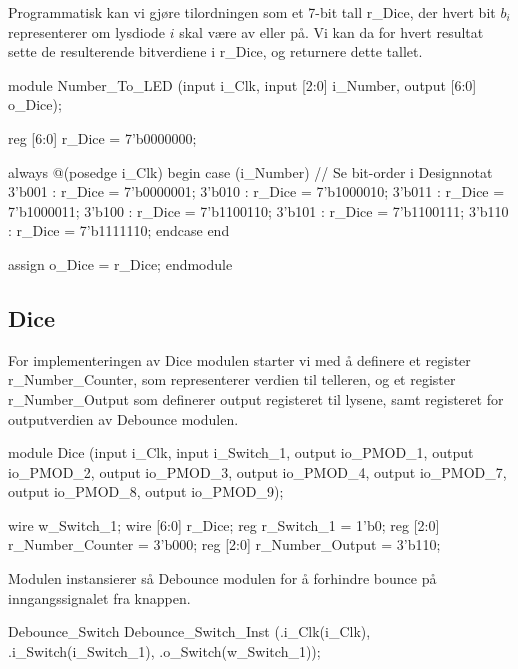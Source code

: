 Programmatisk kan vi gjøre tilordningen som et 7-bit tall r\_Dice, der hvert bit 
$b_i$ representerer om lysdiode $i$ skal være av eller på. Vi kan da for hvert resultat 
sette de resulterende bitverdiene i r\_Dice, og returnere dette tallet. 
\begin{verilogcode}
    module Number_To_LED
        (input i_Clk,
        input [2:0] i_Number,
        output [6:0] o_Dice);

     reg [6:0] r_Dice = 7'b0000000;

     always @(posedge i_Clk)
     begin
         case (i_Number) // Se bit-order i Designnotat 
             3'b001 : r_Dice = 7'b0000001;
             3'b010 : r_Dice = 7'b1000010;
             3'b011 : r_Dice = 7'b1000011;
             3'b100 : r_Dice = 7'b1100110;
             3'b101 : r_Dice = 7'b1100111;
             3'b110 : r_Dice = 7'b1111110;
         endcase
     end

     assign o_Dice = r_Dice;
    endmodule
\end{verilogcode}

\subsection{Dice}
For implementeringen av Dice modulen starter vi med å definere et register r\_Number\_Counter,
som representerer verdien til telleren, og et register r\_Number\_Output som definerer 
output registeret til lysene, samt registeret for outputverdien av Debounce modulen.
\begin{verilogcode}
 module Dice
    (input i_Clk, input i_Switch_1,
     output io_PMOD_1, output io_PMOD_2,
     output io_PMOD_3, output io_PMOD_4,
     output io_PMOD_7, output io_PMOD_8,
     output io_PMOD_9);

 wire       w_Switch_1;
 wire [6:0] r_Dice;
 reg        r_Switch_1 = 1'b0;
 reg  [2:0] r_Number_Counter = 3'b000;
 reg  [2:0] r_Number_Output = 3'b110;
   
\end{verilogcode}

\newpage
Modulen instansierer så Debounce modulen for å forhindre bounce på 
inngangssignalet fra knappen. 
\begin{verilogcode}
  Debounce_Switch Debounce_Switch_Inst
    (.i_Clk(i_Clk),
     .i_Switch(i_Switch_1),
     .o_Switch(w_Switch_1));
\end{verilogcode}

